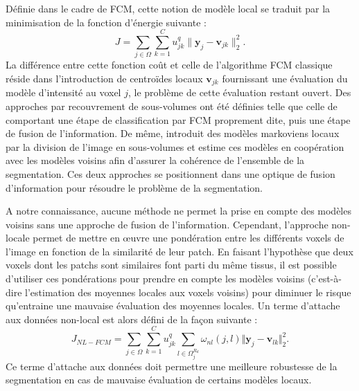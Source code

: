 Définie dans le cadre de FCM, cette notion de modèle local se traduit par la minimisation de la fonction d'énergie suivante : 
\begin{equation}
J = \sum_{j \in \Omega} \sum_{k=1}^{C} u^{q}_{jk} \lVert \mathbf{y}_{j} - \mathbf{v}_{jk} \rVert_{2}^{2}. \label{eq:fcm:local}
\end{equation}
La différence entre cette fonction coût et celle de l'algorithme FCM classique réside dans l'introduction de centroïdes locaux $\mathbf{v}_{jk}$ fournissant une évaluation du modèle d'intensité au voxel $j$, le problème de cette évaluation restant ouvert.
Des approches par recouvrement de sous-volumes ont été définies telle que celle de \cite{Zhu:NeuroImage:2003} comportant une étape de classification par FCM proprement dite, puis une étape de fusion de l'information.
De même, \cite{Scherrer:TMI:2009} introduit des modèles markoviens locaux par la division de l'image en sous-volumes et estime ces modèles en coopération avec les modèles voisins afin d'assurer la cohérence de l'ensemble de la segmentation.
Ces deux approches se positionnent dans une optique de fusion d'information pour résoudre le problème de la segmentation.

A notre connaissance, aucune méthode ne permet la prise en compte des modèles voisins sans une approche de fusion de l'information.
Cependant, l'approche non-locale permet de mettre en \oe uvre une pondération entre les différents voxels de l'image en fonction de la similarité de leur patch.
En faisant l'hypothèse que deux voxels dont les patchs sont similaires font parti du même tissus, il est possible d'utiliser ces pondérations pour prendre en compte les modèles voisins (c'est-à-dire l'estimation des moyennes locales aux voxels voisins) pour diminuer le risque qu’entraine une mauvaise évaluation des moyennes locales.
Un terme d'attache aux données non-local est alors défini de la façon suivante :
\begin{equation}
J_{NL-FCM} = \sum_{j \in \Omega} \sum_{k=1}^{C} u_{jk}^{q} \sum_{l \in \Omega^{R_d}_{j}} \omega_{nl}(j, l) \Vert \mathbf{y}_{j} - \mathbf{v}_{lk} \Vert_2^{2} \label{eq:nlfcm:dd}.
\end{equation}
Ce terme d'attache aux données doit permettre une meilleure robustesse de la segmentation en cas de mauvaise évaluation de certains modèles locaux.

